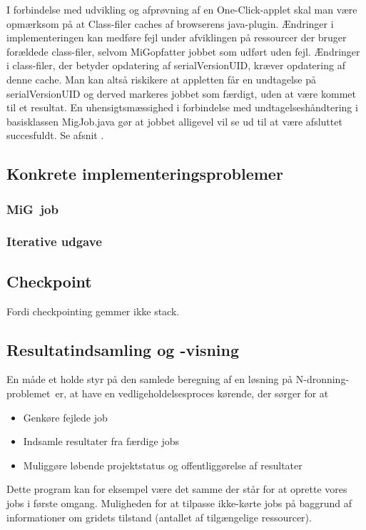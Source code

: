 \documentclass[pdf,draft,a4paper,11pt]{article}
\newcommand{\mig}{MiG}
\newcommand{\oc}{One-Click}
\newcommand{\nq}{N-dronning-problemet}
\begin{document}
I forbindelse med udvikling og afprøvning af en \oc-applet skal man være opmærksom på at Class-filer caches af browserens java-plugin. Ændringer i implementeringen kan medføre fejl under afviklingen på ressourcer der bruger forældede class-filer, selvom \mig opfatter jobbet som udført uden fejl. Ændringer i class-filer, der betyder opdatering af serialVersionUID, kræver opdatering af denne cache. Man kan altså riskikere at appletten får en undtagelse på serialVersionUID og derved markeres jobbet som færdigt, uden at være kommet til et resultat. En uhensigtsmæssighed i forbindelse med undtagelseshåndtering i basisklassen MigJob.java gør at jobbet alligevel vil se ud til at være afsluttet succesfuldt. Se afsnit \cite{bugs}. 


\subsection{Konkrete implementeringsproblemer}
\subsubsection{\mig\ job}\label{label}
\subsubsection{Iterative udgave}
\subsection{Checkpoint}

Fordi checkpointing gemmer ikke stack.

\subsection{Resultatindsamling og -visning}
En måde et holde styr på den samlede beregning af en løsning på \nq\ er, at have en vedligeholdelsesproces kørende, der sørger for at 
\begin{itemize}
	\item Genkøre fejlede job
	\item Indsamle resultater fra færdige jobs
	\item Muliggøre løbende projektstatus og offentliggørelse af resultater 
\end{itemize}
Dette program kan for eksempel være det samme der står for at oprette vores jobs i første omgang. Muligheden for at tilpasse ikke-kørte jobs på baggrund af informationer om gridets tilstand (antallet af tilgængelige ressourcer). 
\end{document}
